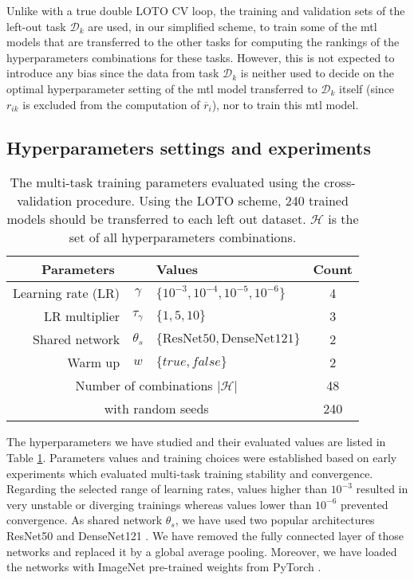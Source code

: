 Unlike with a true double LOTO CV loop, the training and validation sets of the left-out task $\mathcal{D}_k$ are used, in our simplified scheme, to train some of the \acrshort{mtl} models that are transferred to the other tasks for computing the rankings of the hyperparameters combinations for these tasks. However, this is not expected to introduce any bias since the data from task $\mathcal{D}_k$ is neither used to decide on the optimal hyperparameter setting of the \acrshort{mtl} model transferred to $\mathcal{D}_k$ itself (since $r_{ik}$ is excluded from the computation of $\overline{r}_i$), nor to train this \acrshort{mtl} model.

\subsection{Hyperparameters settings and experiments}
\label{ssec:mtask:exp:parameters} 

\begin{table}
    \centering
    \begin{tabular}{|rc|l|c|}
        \hline
        \multicolumn{2}{|c|}{Parameters} & Values & Count \\
        \hline
        Learning rate (LR) & $\gamma$ & $\{10^{-3}, 10^{-4}, 10^{-5}, 10^{-6}\}$ & 4 \\
        LR multiplier & $\tau_\gamma$ & $\{1, 5, 10\}$ & 3 \\
        Shared network & $\theta_s$ & $\{\text{ResNet50}, \text{DenseNet121}\}$ & 2 \\
        Warm up & $w$ & $\{true, false\}$ & 2 \\
        \hline
        \multicolumn{3}{|c|}{Number of combinations $\left|\mathcal{H}\right|$} & 48 \\
        \hline
        \multicolumn{3}{|c|}{with random seeds} & 240 \\
        \hline
    \end{tabular}
    \caption{The multi-task training parameters evaluated using the cross-validation procedure. Using the LOTO scheme, 240 trained models should be transferred to each left out dataset. $\mathcal{H}$ is the set of all hyperparameters combinations.}
    \label{tab:mtask:results:parameters}
\end{table}

The hyperparameters we have studied and their evaluated values are listed in Table \ref{tab:mtask:results:parameters}. Parameters values and training choices were established based on early experiments which evaluated multi-task training stability and convergence. Regarding the selected range of learning rates, values higher than $10^{-3}$ resulted in very unstable or diverging trainings whereas values lower than $10^{-6}$ prevented convergence. As shared network $\theta_s$, we have used two popular architectures ResNet50 \cite{he2016deep} and DenseNet121 \cite{huang2017densely}. We have removed the fully connected layer of those networks and replaced it by a global average pooling. Moreover, we have loaded the networks with ImageNet pre-trained weights from PyTorch \cite{paszke2019pytorch}.

